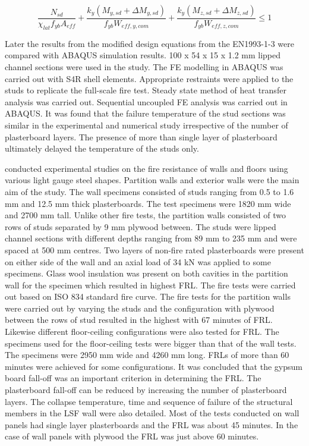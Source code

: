 \begin{equation}
\dfrac{N_{sd}}{\chi_{lat}f_{yb}A_{eff}}+\dfrac{k_y(M_{y,sd}+\Delta M_{y,sd})}{f_{yb}W_{eff,y,com}}+\dfrac{k_y(M_{z,sd}+\Delta M_{z,sd})}{f_{yb}W_{eff,z,com}} \leq 1
\end{equation}

Later the results from the modified design equations from the EN1993-1-3 were compared with ABAQUS simulation results. 100 x 54 x 15 x 1.2 mm lipped channel sections were used in the study. The FE modelling in ABAQUS was carried out with S4R shell elements. Appropriate restraints were applied to the studs to replicate the full-scale fire test. Steady state method of heat transfer analysis was carried out. Sequential uncoupled FE analysis was carried out in ABAQUS. It was found that the failure temperature of the stud sections was similar in the experimental and numerical study irrespective of the number of plasterboard layers. The presence of more than single layer of plasterboard ultimately delayed the temperature of the studs only. 

\citet{Sakumoto2003} conducted experimental studies on the fire resistance of walls and floors using various light gauge steel shapes. Partition walls and exterior walls were the main aim of the study. The wall specimens consisted of studs ranging from 0.5 to 1.6 mm and 12.5 mm thick plasterboards. The test specimens were 1820 mm wide and 2700 mm tall. Unlike other fire tests, the partition walls consisted of two rows of studs separated by 9 mm plywood between. The studs were lipped channel sections with different depths ranging from 89 mm to 235 mm and were spaced at 500 mm centres. Two layers of non-fire rated plasterboards were present on either side of the wall and an axial load of 34 kN was applied to some specimens. Glass wool insulation was present on both cavities in the partition wall for the specimen which resulted in highest FRL. The fire tests were carried out based on ISO 834 standard fire curve. The fire tests for the partition walls were carried out by varying the studs and the configuration with plywood between the rows of stud resulted in the highest with 67 minutes of FRL. Likewise different floor-ceiling configurations were also tested for FRL. The specimens used for the floor-ceiling tests were bigger than that of the wall tests. The specimens were 2950 mm wide and 4260 mm long. FRLs of more than 60 minutes were achieved for some configurations. It was concluded that the gypsum board fall-off was an important criterion in determining the FRL. The plasterboard fall-off can be reduced by increasing the number of plasterboard layers. The collapse temperature, time and sequence of failure of the structural members in the LSF wall were also detailed. Most of the tests conducted on wall panels had single layer plasterboards and the FRL was about 45 minutes. In the case of wall panels with plywood the FRL was just above 60 minutes. 

